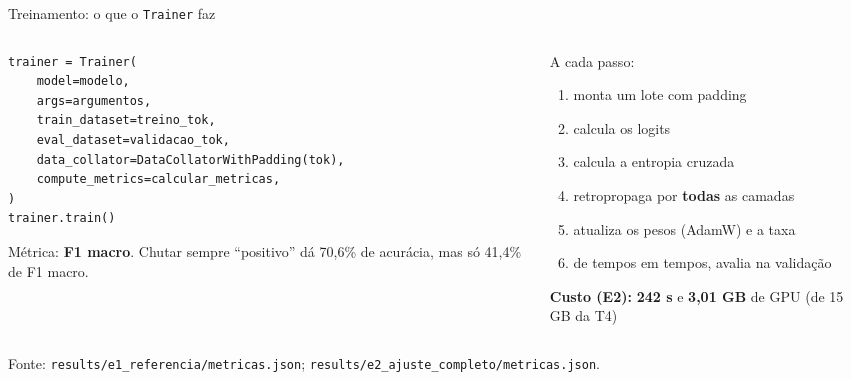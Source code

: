 \documentclass[aspectratio=169,10pt]{beamer}
\newcommand{\fonte}[1]{\par\vfill{\scriptsize\color{tinta2}Fonte: #1}}
\newcommand{\destaque}[1]{{\color{azul}\bfseries #1}}
\begin{document}
\begin{frame}[fragile]{Treinamento: o que o \texttt{Trainer} faz}
  \begin{columns}[T]
    \begin{column}{0.5\textwidth}
      \begin{lstlisting}
trainer = Trainer(
    model=modelo,
    args=argumentos,
    train_dataset=treino_tok,
    eval_dataset=validacao_tok,
    data_collator=DataCollatorWithPadding(tok),
    compute_metrics=calcular_metricas,
)
trainer.train()
      \end{lstlisting}
      \small Métrica: \textbf{F1 macro}. Chutar sempre ``positivo'' dá 70,6\% de acurácia, mas só 41,4\% de F1 macro.
    \end{column}
    \begin{column}{0.45\textwidth}
      A cada passo:
      \begin{enumerate}
        \item monta um lote com padding
        \item calcula os logits
        \item calcula a entropia cruzada
        \item retropropaga por \destaque{todas} as camadas
        \item atualiza os pesos (AdamW) e a taxa
        \item de tempos em tempos, avalia na validação
      \end{enumerate}
      \vspace{0.3em}
      \textbf{Custo (E2):} \destaque{242 s} e \destaque{3,01 GB} de GPU (de 15 GB da T4)
    \end{column}
  \end{columns}
  \fonte{\texttt{results/e1\_referencia/metricas.json}; \texttt{results/e2\_ajuste\_completo/metricas.json}.}
\end{frame}

\end{document}
